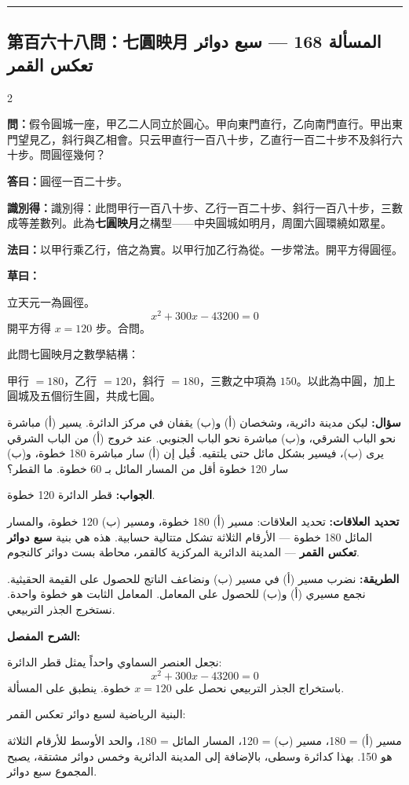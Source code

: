 \documentclass[11pt,a4paper]{article}
\newcommand{\ar}[1]{\arabicfont\beginR #1\endR}
\newcommand{\arb}[1]{\textbf{\arabicfont\beginR #1\endR}}
\newcommand{\longline}{\noindent\rule{\textwidth}{0.4pt}}
\newcommand{\arnote}[1]{\textcolor{arabicblue}{\ar{#1}}}
\newcommand{\wen}[1]{\par\noindent\textbf{\textcolor{probcolor}{問：}}{#1}\par}
\newcommand{\da}[1]{\par\noindent\textbf{\textcolor{anscolor}{答曰：}}{#1}\par}
\newcommand{\fayue}[1]{\par\noindent\textbf{\textcolor{methodcolor}{法曰：}}{#1}\par}
\newcommand{\caoyue}[1]{\par\noindent\textbf{草曰：}{#1}\par}
\newcommand{\zhi}[1]{\par\noindent\textbf{識別得：}{#1}\par}
\newcommand{\arwen}[1]{\par\noindent\arb{سؤال: }\arnote{#1}\par}
\newcommand{\arjwb}[1]{\par\noindent\arb{الجواب: }\arnote{#1}\par}
\newcommand{\arqwd}[1]{\par\noindent\arb{الطريقة: }\arnote{#1}\par}
\newcommand{\arshr}[1]{\par\noindent\arb{الشرح المفصل: }\arnote{#1}\par}
\newcommand{\arfl}[1]{\par\noindent\arb{تحديد العلاقات: }\arnote{#1}\par}
\begin{document}
\vspace{0.3cm}
\longline

\subsection*{第百六十八問：七圓映月 \hfill \ar{المسألة 168 — سبع دوائر تعكس القمر}}

\begin{paracol}{2}

\begin{leftcolumn}
\wen{假令圓城一座，甲乙二人同立於圓心。甲向東門直行，乙向南門直行。甲出東門望見乙，斜行與乙相會。只云甲直行一百八十步，乙直行一百二十步不及斜行六十步。問圓徑幾何？}

\da{圓徑一百二十步。}

\zhi{識別得：此問甲行一百八十步、乙行一百二十步、斜行一百八十步，三數成等差數列。此為\textbf{七圓映月}之構型——中央圓城如明月，周圍六圓環繞如眾星。}

\fayue{以甲行乘乙行，倍之為實。以甲行加乙行為從。一步常法。開平方得圓徑。}

\caoyue{
立天元一為圓徑。
$$x^2 + 300x - 43200 = 0$$
開平方得 $x = 120$ 步。合問。

此問七圓映月之數學結構：

甲行 $= 180$，乙行 $= 120$，斜行 $= 180$，三數之中項為 $150$。以此為中圓，加上圓城及五個衍生圓，共成七圓。}
\end{leftcolumn}

\begin{rightcolumn}
\arwen{ليكن مدينة دائرية، وشخصان (أ) و(ب) يقفان في مركز الدائرة. يسير (أ) مباشرة نحو الباب الشرقي، و(ب) مباشرة نحو الباب الجنوبي. عند خروج (أ) من الباب الشرقي يرى (ب)، فيسير بشكل مائل حتى يلتقيه. قُيل إن (أ) سار مباشرة 180 خطوة، و(ب) سار 120 خطوة أقل من المسار المائل بـ 60 خطوة. ما القطر؟}

\arjwb{قطر الدائرة 120 خطوة.}

\arfl{تحديد العلاقات: مسير (أ) 180 خطوة، ومسير (ب) 120 خطوة، والمسار المائل 180 خطوة — الأرقام الثلاثة تشكل متتالية حسابية. هذه هي بنية \textbf{سبع دوائر تعكس القمر} — المدينة الدائرية المركزية كالقمر، محاطة بست دوائر كالنجوم.}

\arqwd{نضرب مسير (أ) في مسير (ب) ونضاعف الناتج للحصول على القيمة الحقيثية. نجمع مسيري (أ) و(ب) للحصول على المعامل. المعامل الثابت هو خطوة واحدة. نستخرج الجذر التربيعي.}

\arshr{نجعل العنصر السماوي واحداً يمثل قطر الدائرة:
$$x^2 + 300x - 43200 = 0$$
باستخراج الجذر التربيعي نحصل على $x = 120$ خطوة. ينطبق على المسألة.

البنية الرياضية لسبع دوائر تعكس القمر:

مسير (أ) = 180، مسير (ب) = 120، المسار المائل = 180، والحد الأوسط للأرقام الثلاثة هو 150. بهذا كدائرة وسطى، بالإضافة إلى المدينة الدائرية وخمس دوائر مشتقة، يصبح المجموع سبع دوائر.}
\end{rightcolumn}

\end{paracol}
\end{document}
